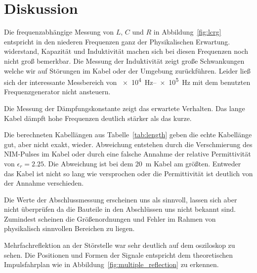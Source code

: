 \section{Diskussion}\label{sec:Diskussion}

Die frequenzabhängige Messung von $L$, $C$ und $R$ in Abbildung~\ref{fig:lcrg} entspricht in den niederen Frequenzen ganz der Physikalischen Erwartung.
widerstand, Kapazität und Induktivität machen sich bei diesen Frequenzen noch nicht groß bemerkbar. Die Messung der Induktivität zeigt große Schwankungen
welche wir auf Störungen im Kabel oder der Umgebung zurückführen. Leider ließ sich der interessante Messbereich von \SIrange[range-phrase={~bis~}]{e4}{e5}{\hertz}
mit dem benutzten Frequenzgenerator nicht ansteuern.

Die Messung der Dämpfungskonstante zeigt das erwartete Verhalten. Das lange Kabel dämpft hohe Frequenzen deutlich stärker als das kurze.

Die berechneten Kabellängen aus Tabelle~\ref{tab:length} geben die echte Kabellänge gut, aber nicht exakt, wieder. Abweichung entstehen durch die Verschmierung
des NIM-Pulses im Kabel oder durch eine falsche Annahme der relative Permittivität von $\epsilon_r = \num{2.25}$. Die Abweichung ist bei dem \SI{20}{\meter} Kabel
am größten. Entweder das Kabel ist nicht so lang wie versprochen oder die Permittivität ist deutlich von der Annahme verschieden.

Die Werte der Abschlussmessung erscheinen uns als sinnvoll, lassen sich aber nicht überprüfen da die Bauteile in den Abschlüssen uns nicht bekannt sind.
Zumindest scheinen die Größenordnungen und Fehler im Rahmen von physikalisch sinnvollen Bereichen zu liegen.

Mehrfachreflektion an der Störstelle war sehr deutlich auf dem osziloskop zu sehen. Die Positionen und Formen der Signale entspricht dem theoretischen Impulsfahrplan
wie in Abbildung~\ref{fig:multiple_reflection} zu erkennen.

 
